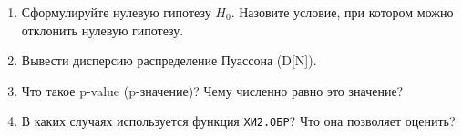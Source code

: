 \documentclass[14pt,a4paper]{article}
\begin{document}


\questions{}
\begin{enumerate}
	\item Сформулируйте нулевую гипотезу $H_0$. Назовите условие, при котором можно отклонить нулевую гипотезу.
	\item Вывести дисперсию распределение Пуассона (D[N]).
	\item Что такое p-value (p-значение)? Чему численно равно это значение?
	\item В каких случаях используется функция \texttt{ХИ2.ОБР}? Что она позволяет оценить?
\end{enumerate}
\end{document}

